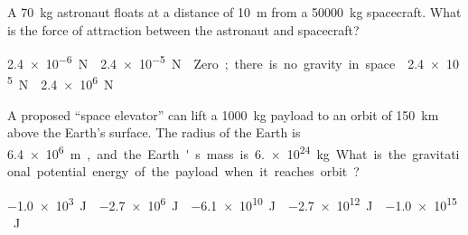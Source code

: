 \documentclass{../../oss-apphys-exam}
\begin{document}



\raggedcolumns
\begin{multicols*}{2}
  \begin{questions}
    \question A \SI{70}{\kilo\gram} astronaut floats at a distance of
    \SI{10}{\metre} from a \SI{50000}{\kilo\gram} spacecraft. What is the force
    of attraction between the astronaut and spacecraft?
    \begin{choices}
      \choice\SI{2.4e-6}\newton
      \choice\SI{2.4e-5}\newton
      \choice Zero; there is no gravity in space.
      \choice\SI{2.4e5}\newton
      \choice\SI{2.4e6}\newton
    \end{choices}
    \vspace{.5in}
    
    
    \question A proposed ``space elevator'' can lift a \SI{1000}{\kilo\gram}
    payload to an orbit of \SI{150}{\kilo\metre} above the Earth's surface. The
    radius of the Earth is \SI{6.4e6}\metre, and the Earth's mass is
    \SI{6.e24}{\kilo\gram}. What is the gravitational potential energy of the
    payload when it reaches orbit?
    \begin{choices}
      \choice\SI{-1.0e3}\joule
      \choice\SI{-2.7e6}\joule
      \choice\SI{-6.1e10}\joule
      \choice\SI{-2.7e12}\joule
      \choice\SI{-1.0e15}\joule
    \end{choices}
    
%    


\end{questions}
\end{multicols*}
\end{document}
